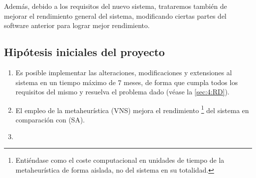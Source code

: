 Además, debido a los requisitos del nuevo sistema, trataremos también de mejorar el rendimiento general del sistema, modificando ciertas partes del software anterior para lograr mejor rendimiento.

\subsection{Hipótesis iniciales del proyecto}
\label{sec:Hipotesis}
\begin{enumerate}[label={H\arabic*}]
	\item \label{H1} Es posible implementar las alteraciones, modificaciones y extensiones al sistema en un tiempo máximo de 7 meses, de forma que cumpla todos los requisitos del mismo y resuelva el problema dado (véase la \autoref{sec:4:RD}).
	\item \label{H2} El empleo de la metaheurística \vns{} (VNS) mejora el rendimiento%
	\footnote{Entiéndase como el coste computacional en unidades de tiempo  de la metaheurística de forma aislada, no del sistema en su totalidad.}
	del sistema en comparación con \sa{} (SA).
	\item \label{H3} 
\end{enumerate}

%
%
\glsaddall
\printglossary[title={Definiciones, acrónimos y abreviaturas}, nonumberlist]
%
%
%